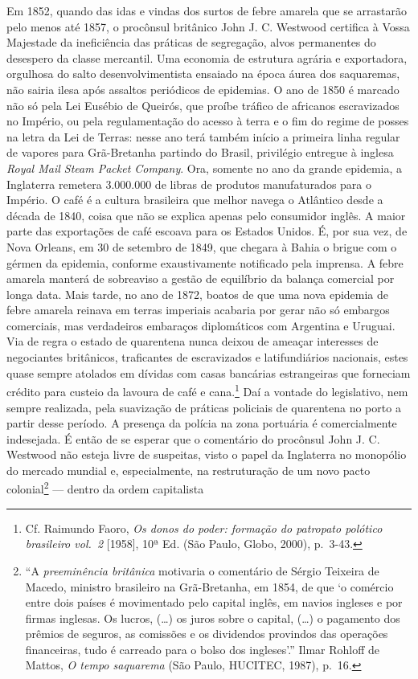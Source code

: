 Em 1852, quando das idas e vindas dos surtos de febre amarela que se
arrastarão pelo menos até 1857, o procônsul britânico John J. C.
Westwood certifica à Vossa Majestade da ineficiência das práticas de
segregação, alvos permanentes do desespero da classe mercantil. Uma
economia de estrutura agrária e exportadora, orgulhosa do salto
desenvolvimentista ensaiado na época áurea dos saquaremas, não sairia
ilesa após assaltos periódicos de epidemias. O ano de 1850 é marcado não
só pela Lei Eusébio de Queirós, que proíbe tráfico de africanos
escravizados no Império, ou pela regulamentação do acesso à terra e o
fim do regime de posses na letra da Lei de Terras: nesse ano terá também
início a primeira linha regular de vapores para Grã-Bretanha partindo do
Brasil, privilégio entregue à inglesa \textit{Royal Mail Steam Packet
Company}. Ora, somente no ano da grande epidemia, a Inglaterra remetera
3.000.000 de libras de produtos manufaturados para o Império. O café é a
cultura brasileira que melhor navega o Atlântico desde a década de 1840,
coisa que não se explica apenas pelo consumidor inglês. A maior parte
das exportações de café escoava para os Estados Unidos. É, por sua vez,
de Nova Orleans, em 30 de setembro de 1849, que chegara à Bahia o brigue
com o gérmen da epidemia, conforme exaustivamente notificado pela
imprensa. A febre amarela manterá de sobreaviso a gestão de equilíbrio
da balança comercial por longa data. Mais tarde, no ano de 1872, boatos
de que uma nova epidemia de febre amarela reinava em terras imperiais
acabaria por gerar não só embargos comerciais, mas verdadeiros embaraços
diplomáticos com Argentina e Uruguai. Via de regra o estado de
quarentena nunca deixou de ameaçar interesses de negociantes britânicos,
traficantes de escravizados e latifundiários nacionais, estes quase
sempre atolados em dívidas com casas bancárias estrangeiras que
forneciam crédito para custeio da lavoura de café e cana.\footnote{Cf.
  Raimundo Faoro, \textit{Os donos do poder: formação do patropato
  polótico brasileiro vol.~2} {[}1958{]}, 10ª Ed. (São Paulo, Globo,
  2000), p.~3-43.} Daí a vontade do legislativo, nem sempre realizada,
pela suavização de práticas policiais de quarentena no porto a partir
desse período. A presença da polícia na zona portuária é comercialmente
indesejada. É então de se esperar que o comentário do procônsul John J.
C. Westwood não esteja livre de suspeitas, visto o papel da Inglaterra
no monopólio do mercado mundial e, especialmente, na restruturação de um
novo pacto colonial\footnote{``A \textit{preeminência britânica} motivaria
  o comentário de Sérgio Teixeira de Macedo, ministro brasileiro na
  Grã-Bretanha, em 1854, de que `o comércio entre dois países é
  movimentado pelo capital inglês, em navios ingleses e por firmas
  inglesas. Os lucros, (\ldots{}) os juros sobre o capital, (\ldots{}) o
  pagamento dos prêmios de seguros, as comissões e os dividendos
  provindos das operações financeiras, tudo é carreado para o bolso dos
  ingleses'.'' Ilmar Rohloff de Mattos, \textit{O tempo saquarema} (São
  Paulo, HUCITEC, 1987), p.~16.} --- dentro da ordem capitalista
